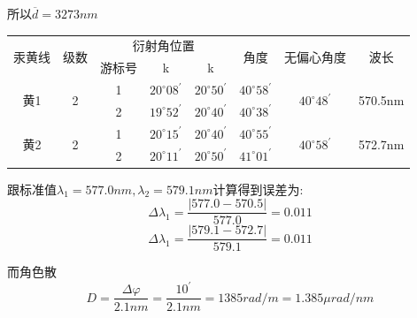 \documentclass[12pt,a4paper,UTF8]{ctexart}
\begin{document}
\par 所以$\overline{d}=3273nm$
\clearpage
\begin{table}[!htbp]
	\centering
	\begin{tabular}{c|c|ccc|c|c|c}
		\hline
		\multirow{2}{*}{汞黄线} & \multirow{2}{*}{级数} & \multicolumn{3}{c|}{衍射角位置}                                                                        & \multirow{2}{*}{角度}     & \multirow{2}{*}{无偏心角度}                   & \multirow{2}{*}{波长} \\ 
		\cline{3-5}
		&                     & \multicolumn{1}{c|}{游标号} & \multicolumn{1}{c|}{k}                       & k                       &                         &                                          &                       \\ 
		\hline
		\multirow{2}{*}{黄1}  & \multirow{2}{*}{2}  & \multicolumn{1}{c|}{1}   & \multicolumn{1}{c|}{$20^{\circ}08^{\prime}$} & $20^{\circ}50^{\prime}$ & $40^{\circ}58^{\prime}$ & \multirow{2}{*}{$40^{\circ}48^{\prime}$} & \multirow{2}{*}{570.5nm}     \\ 
		\cline{3-6}
		&                     & \multicolumn{1}{c|}{2}   & \multicolumn{1}{c|}{$19^{\circ}52^{\prime}$} & $20^{\circ}40^{\prime}$ & $40^{\circ}38^{\prime}$ &                                          &                       \\ 
		\hline
		\multirow{2}{*}{黄2}  & \multirow{2}{*}{2}  & \multicolumn{1}{c|}{1}   & \multicolumn{1}{c|}{$20^{\circ}15^{\prime}$} & $20^{\circ}40^{\prime}$ & $40^{\circ}55^{\prime}$ & \multirow{2}{*}{$40^{\circ}58^{\prime}$} & \multirow{2}{*}{572.7nm}     \\ 
		\cline{3-6}
		&                     & \multicolumn{1}{c|}{2}   & \multicolumn{1}{c|}{$20^{\circ}11^{\prime}$} & $20^{\circ}50^{\prime}$ & $41^{\circ}01^{\prime}$ &                                          &                       \\ 
		\hline
	\end{tabular}
\end{table}
\par 跟标准值$\lambda_1 = 577.0nm,\lambda_2 = 579.1nm$计算得到误差为:
\[ \Delta \lambda_1 = \frac{|577.0-570.5|}{577.0}=0.011  \]
\[\Delta \lambda_1 = \frac{|579.1-572.7|}{579.1}=0.011\]
\par 而角色散
\[D = \frac{\Delta \varphi}{2.1nm} = \frac{10^{\prime}}{2.1nm} = 1385 rad/m = 1.385 \mu rad / nm\]
\end{document}
